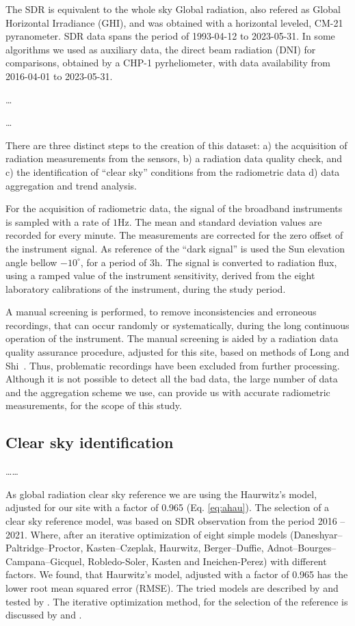 \documentclass[preprint, 3p,
authoryear]{elsarticle} %
\begin{document}
The SDR is equivalent to the whole sky Global radiation, also refered as
Global Horizontal Irradiance (GHI), and was obtained with a horizontal
leveled, CM-21 pyranometer. SDR data spans the period of 1993-04-12 to
2023-05-31. In some algorithms we used as auxiliary data, the direct
beam radiation (DNI) for comparisons, obtained by a CHP-1 pyrheliometer,
with data availability from 2016-04-01 to 2023-05-31.

\ldots{}

\ldots{}

There are three distinct steps to the creation of this dataset: a) the
acquisition of radiation measurements from the sensors, b) a radiation
data quality check, and c) the identification of ``clear sky''
conditions from the radiometric data d) data aggregation and trend
analysis.

For the acquisition of radiometric data, the signal of the broadband
instruments is sampled with a rate of \(1 \text{Hz}\). The mean and
standard deviation values are recorded for every minute. The
measurements are corrected for the zero offset of the instrument signal.
As reference of the ``dark signal'' is used the Sun elevation angle
bellow \(-10^\circ\), for a period of \(3 \text{h}\). The signal is
converted to radiation flux, using a ramped value of the instrument
sensitivity, derived from the eight laboratory calibrations of the
instrument, during the study period.

A manual screening is performed, to remove inconsistencies and erroneous
recordings, that can occur randomly or systematically, during the long
continuous operation of the instrument. The manual screening is aided by
a radiation data quality assurance procedure, adjusted for this site,
based on methods of Long and Shi~\citetext{\citealp[
]{Long2008a}; \citealp{Long2006}}. Thus, problematic recordings have
been excluded from further processing. Although it is not possible to
detect all the bad data, the large number of data and the aggregation
scheme we use, can provide us with accurate radiometric measurements,
for the scope of this study.

\hypertarget{clear-sky-identification}{%
\subsection{Clear sky identification}\label{clear-sky-identification}}

\ldots\ldots{}

As global radiation clear sky reference we are using the Haurwitz's
model, adjusted for our site with a factor of 0.965 (Eq. \ref{eq:ahau}).
The selection of a clear sky reference model, was based on SDR
observation from the period 2016 -- 2021. Where, after an iterative
optimization of eight simple models (Daneshyar--Paltridge--Proctor,
Kasten--Czeplak, Haurwitz, Berger--Duffie,
Adnot--Bourges--Campana--Gicquel, Robledo-Soler, Kasten and
Ineichen-Perez) with different factors. We found, that Haurwitz's model,
adjusted with a factor of 0.965 has the lower root mean squared error
(RMSE). The tried models are described by \citet{Reno2012} and tested by
\citet{Reno2016}. The iterative optimization method, for the selection
of the reference is discussed by \citet{Long2000} and \citet{Reno2016}.
\end{document}
